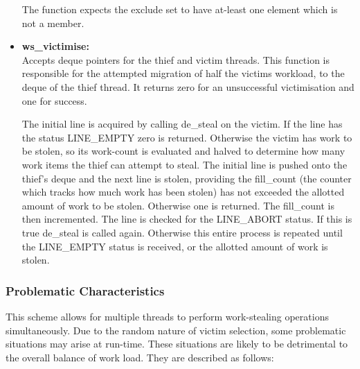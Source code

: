 \begin{itemize}
                The function expects the exclude set to have at-least one element which is not a member.
                
\item \textbf{ws\_victimise: } \\
                Accepts deque pointers for the thief and victim threads. This function is responsible for the attempted migration of half the victims 
                workload, to the deque of the thief thread. It returns zero for an unsuccessful victimisation and one for success.
                
                The initial line is acquired by calling de\_steal on the victim. If the line has the status LINE\_EMPTY zero is returned. 
                Otherwise the victim has work to be stolen, so its work-count is evaluated and halved to determine how many work items the thief
                can attempt to steal.
                The initial line is pushed onto the thief's deque and the next line is stolen, providing the fill\_count (the counter which
                tracks how much work has been stolen) has not exceeded the allotted amount of work to be stolen. Otherwise one is returned.
                The fill\_count is then incremented. 
                The line is checked for the LINE\_ABORT status. If this is true de\_steal is called again.
                Otherwise this entire process is repeated until the LINE\_EMPTY status is received, or the allotted amount of work is stolen.
\end{itemize}

\subsubsection*{Problematic Characteristics}

This scheme allows for multiple threads to perform work-stealing operations simultaneously. 
Due to the random nature of victim selection, some problematic situations may arise at run-time.
These situations are likely to be detrimental to the overall balance of work load.
They are described as follows:

